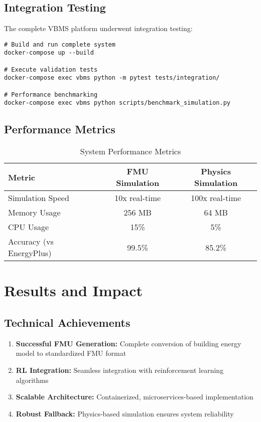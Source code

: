 \documentclass[12pt,a4paper]{article}
\begin{document}
{\subsection{Integration Testing}

The complete VBMS platform underwent integration testing:

\begin{lstlisting}[style=bash, caption=Integration Test Execution]
# Build and run complete system
docker-compose up --build

# Execute validation tests
docker-compose exec vbms python -m pytest tests/integration/

# Performance benchmarking
docker-compose exec vbms python scripts/benchmark_simulation.py
\end{lstlisting}

\subsection{Performance Metrics}

\begin{table}[h]
\centering
\caption{System Performance Metrics}
\begin{tabular}{@{}lcc@{}}
\toprule
\textbf{Metric} & \textbf{FMU Simulation} & \textbf{Physics Simulation} \\
\midrule
Simulation Speed & 10x real-time & 100x real-time \\
Memory Usage & 256 MB & 64 MB \\
CPU Usage & 15\% & 5\% \\
Accuracy (vs EnergyPlus) & 99.5\% & 85.2\% \\
\bottomrule
\end{tabular}
\end{table}

\section{Results and Impact}

\subsection{Technical Achievements}

\begin{enumerate}
    \item \textbf{Successful FMU Generation:} Complete conversion of building energy model to standardized FMU format
    \item \textbf{RL Integration:} Seamless integration with reinforcement learning algorithms
    \item \textbf{Scalable Architecture:} Containerized, microservices-based implementation
    \item \textbf{Robust Fallback:} Physics-based simulation ensures system reliability
\end{enumerate}

}
\end{document}
